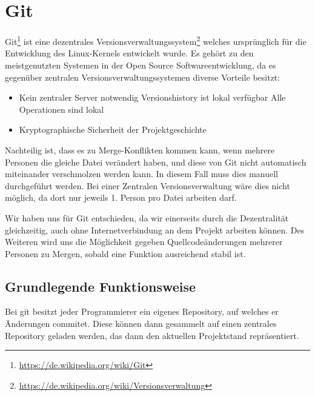 

\section{Git}

Git\footnote{\url{https://de.wikipedia.org/wiki/Git}} ist eine dezentrales Versionsverwaltungssystem\footnote{\url{https://de.wikipedia.org/wiki/Versionsverwaltung}} welches urspr\"unglich f\"ur die Entwicklung des Linux-Kernels entwickelt wurde. Es geh\"ort zu den meistgenutzten Systemen in der Open Source Softwareentwicklung, da es gegen\"uber zentralen Versionsverwaltungssystemen diverse Vorteile besitzt:

\begin{itemize}
  \item Kein zentraler Server notwendig
  \subitem Versionshistory ist lokal verf\"ugbar
  \subitem Alle Operationen sind lokal
  \item Kryptographische Sicherheit der Projektgeschichte
\end{itemize}

Nachteilig ist, dass es zu Merge-Konflikten kommen kann, wenn mehrere Personen die gleiche Datei ver\"andert haben, und diese von Git nicht automatisch miteinander verschmolzen werden kann. In diesem Fall muss dies manuell durchgef\"uhrt werden. Bei einer Zentralen Versionsverwaltung w\"are dies nicht m\"oglich, da dort nur jeweils 1. Person pro Datei arbeiten darf.

Wir haben uns f\"ur Git entschieden, da wir einerseits durch die Dezentralit\"at gleichzeitig, auch ohne Internetverbindung an dem Projekt arbeiten k\"onnen. Des Weiteren wird uns die M\"oglichkeit gegeben Quellcode\"anderungen mehrerer Personen zu Mergen, sobald eine Funktion ausreichend stabil ist.

\subsection{Grundlegende Funktionsweise}

Bei git besitzt jeder Programmierer ein eigenes Repository, auf welches er \"Anderungen commitet. Diese k\"onnen dann gesammelt auf einen zentrales Repository geladen werden, das dann den aktuellen Projektstand repr\"asentiert.

